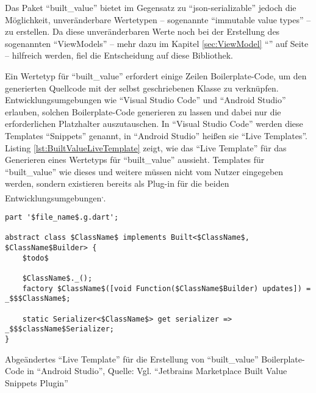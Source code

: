Das Paket \enquote{built_value} bietet im Gegensatz zu \enquote{json-serializable} jedoch die Möglichkeit, unveränderbare Wertetypen -- sogenannte \enquote{immutable value types} -- zu erstellen.
Da diese unveränderbaren Werte noch bei der Erstellung des sogenannten \enquote{ViewModels}
-- mehr dazu im Kapitel \ref{sec:ViewModel} \enquote{} auf Seite \pageref{sec:ViewModel} -- hilfreich werden,
fiel die Entscheidung auf diese Bibliothek.

Ein Wertetyp für \enquote{built_value} erfordert einige Zeilen Boilerplate-Code, um den generierten Quellcode mit der selbst geschriebenen Klasse zu verknüpfen.
Entwicklungsumgebungen wie \enquote{Visual Studio Code} und \enquote{Android Studio} erlauben,
solchen Boilerplate-Code generieren zu lassen und dabei nur die erforderlichen Platzhalter auszutauschen.
In \enquote{Visual Studio Code} werden diese Templates \enquote{Snippets} genannt, in \enquote{Android Studio} heißen sie \enquote{Live Templates}.
Listing \ref{lst:BuiltValueLiveTemplate} zeigt, wie das \enquote{Live Template} für das Generieren eines Wertetyps  für \enquote{built_value} aussieht.
Templates für \enquote{built_value} wie dieses und weitere müssen nicht vom Nutzer eingegeben werden,
sondern existieren bereits als Plug-in für die beiden Entwicklungsumgebungen\textsuperscript{,}.


\ifIncludeFigures
  \begin{listing}[h]
    \begin{verbatim}
part '$file_name$.g.dart';

abstract class $ClassName$ implements Built<$ClassName$, $ClassName$Builder> {
    $todo$
    
    $ClassName$._();
    factory $ClassName$([void Function($ClassName$Builder) updates]) = _$$$ClassName$;

    static Serializer<$ClassName$> get serializer => _$$$className$Serializer;
}
\end{verbatim}
    \caption[Abgeändertes \enquote{Live Template} für die Erstellung von \enquote{built_value} Boilerplate-Code in \enquote{Android Studio}]{Abgeändertes \enquote{Live Template} für die Erstellung von \enquote{built_value} Boilerplate-Code in \enquote{Android Studio}, Quelle: Vgl. \enquote{Jetbrains Marketplace Built Value Snippets Plugin}}
    \label{lst:BuiltValueLiveTemplate}
  \end{listing}
\fi

